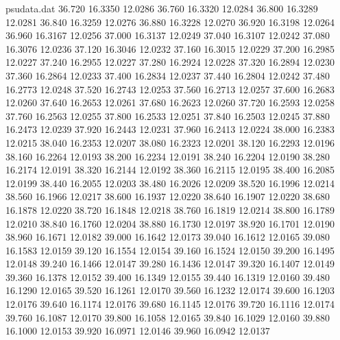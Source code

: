 \begin{filecontents*}{psudata.dat}
36.720 16.3350 12.0286
36.760 16.3320 12.0284
36.800 16.3289 12.0281
36.840 16.3259 12.0276
36.880 16.3228 12.0270
36.920 16.3198 12.0264
36.960 16.3167 12.0256
37.000 16.3137 12.0249
37.040 16.3107 12.0242
37.080 16.3076 12.0236
37.120 16.3046 12.0232
37.160 16.3015 12.0229
37.200 16.2985 12.0227
37.240 16.2955 12.0227
37.280 16.2924 12.0228
37.320 16.2894 12.0230
37.360 16.2864 12.0233
37.400 16.2834 12.0237
37.440 16.2804 12.0242
37.480 16.2773 12.0248
37.520 16.2743 12.0253
37.560 16.2713 12.0257
37.600 16.2683 12.0260
37.640 16.2653 12.0261
37.680 16.2623 12.0260
37.720 16.2593 12.0258
37.760 16.2563 12.0255
37.800 16.2533 12.0251
37.840 16.2503 12.0245
37.880 16.2473 12.0239
37.920 16.2443 12.0231
37.960 16.2413 12.0224
38.000 16.2383 12.0215
38.040 16.2353 12.0207
38.080 16.2323 12.0201
38.120 16.2293 12.0196
38.160 16.2264 12.0193
38.200 16.2234 12.0191
38.240 16.2204 12.0190
38.280 16.2174 12.0191
38.320 16.2144 12.0192
38.360 16.2115 12.0195
38.400 16.2085 12.0199
38.440 16.2055 12.0203
38.480 16.2026 12.0209
38.520 16.1996 12.0214
38.560 16.1966 12.0217
38.600 16.1937 12.0220
38.640 16.1907 12.0220
38.680 16.1878 12.0220
38.720 16.1848 12.0218
38.760 16.1819 12.0214
38.800 16.1789 12.0210
38.840 16.1760 12.0204
38.880 16.1730 12.0197
38.920 16.1701 12.0190
38.960 16.1671 12.0182
39.000 16.1642 12.0173
39.040 16.1612 12.0165
39.080 16.1583 12.0159
39.120 16.1554 12.0154
39.160 16.1524 12.0150
39.200 16.1495 12.0148
39.240 16.1466 12.0147
39.280 16.1436 12.0147
39.320 16.1407 12.0149
39.360 16.1378 12.0152
39.400 16.1349 12.0155
39.440 16.1319 12.0160
39.480 16.1290 12.0165
39.520 16.1261 12.0170
39.560 16.1232 12.0174
39.600 16.1203 12.0176
39.640 16.1174 12.0176
39.680 16.1145 12.0176
39.720 16.1116 12.0174
39.760 16.1087 12.0170
39.800 16.1058 12.0165
39.840 16.1029 12.0160
39.880 16.1000 12.0153
39.920 16.0971 12.0146
39.960 16.0942 12.0137
\end{filecontents*}
\documentclass[11pt,a4paper]{article}
\usepackage[margin=1.9cm,top=2.1cm,bottom=2.1cm]{geometry}
\usepackage{amsmath,amssymb}
\usepackage[siunitx,american]{circuitikz}
\usepackage{pgfplots}
\pgfplotsset{compat=1.16}
\usetikzlibrary{arrows.meta,positioning,shapes.geometric,calc,fit,backgrounds,external}
\usepackage{booktabs,tabularx,array}
\usepackage{tcolorbox}
\usepackage{pdflscape}
\usepackage{float}
\usepackage{enumitem}
\usepackage{fancyhdr}
\usepackage[colorlinks,linkcolor=blue!50!black,urlcolor=blue!50!black]{hyperref}

\setlength{\parindent}{0pt}
\setlength{\parskip}{4pt}
\pagestyle{fancy}
\fancyhf{}
\cfoot{\small\thepage}
\renewcommand{\headrulewidth}{0.3pt}

